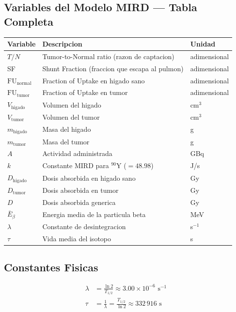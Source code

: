 \documentclass[12pt,a4paper]{article}
\begin{document}
\subsection{Variables del Modelo MIRD --- Tabla Completa}

\begin{table}[H]
\centering
\begin{tabular}{lll}
\toprule
\textbf{Variable} & \textbf{Descripcion} & \textbf{Unidad} \\
\midrule
$T/N$ & Tumor-to-Normal ratio (razon de captacion) & adimensional \\
SF & Shunt Fraction (fraccion que escapa al pulmon) & adimensional \\
$\text{FU}_{\text{normal}}$ & Fraction of Uptake en higado sano & adimensional \\
$\text{FU}_{\text{tumor}}$ & Fraction of Uptake en tumor & adimensional \\
$V_{\text{higado}}$ & Volumen del higado & cm$^3$ \\
$V_{\text{tumor}}$ & Volumen del tumor & cm$^3$ \\
$m_{\text{higado}}$ & Masa del higado & g \\
$m_{\text{tumor}}$ & Masa del tumor & g \\
$A$ & Actividad administrada & GBq \\
$k$ & Constante MIRD para $^{90}$Y ($= 48.98$) & J/s \\
$D_{\text{higado}}$ & Dosis absorbida en higado sano & Gy \\
$D_{\text{tumor}}$ & Dosis absorbida en tumor & Gy \\
$D$ & Dosis absorbida generica & Gy \\
$\bar{E}_\beta$ & Energia media de la particula beta & MeV \\
$\lambda$ & Constante de desintegracion & s$^{-1}$ \\
$\tau$ & Vida media del isotopo & s \\
\bottomrule
\end{tabular}
\end{table}

\subsection{Constantes Fisicas}

\begin{align}
    \lambda &= \frac{\ln 2}{T_{1/2}} \approx 3.00 \times 10^{-6} \text{ s}^{-1} \\
    \tau &= \frac{1}{\lambda} = \frac{T_{1/2}}{\ln 2} \approx 332\,916 \text{ s}
\end{align}
\end{document}

